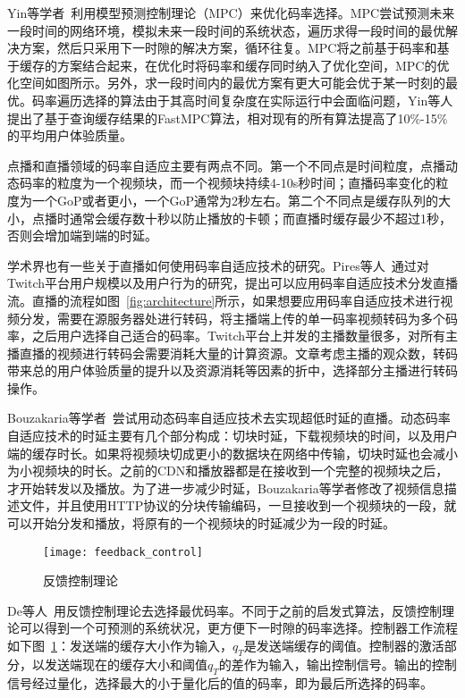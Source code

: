 Yin等学者~\cite{yin2015control}利用模型预测控制理论（MPC）来优化码率选择。MPC尝试预测未来一段时间的网络环境，模拟未来一段时间的系统状态，遍历求得一段时间的最优解决方案，然后只采用下一时隙的解决方案，循环往复。MPC将之前基于码率和基于缓存的方案结合起来，在优化时将码率和缓存同时纳入了优化空间，MPC的优化空间如图所示。另外，求一段时间内的最优方案有更大可能会优于某一时刻的最优。码率遍历选择的算法由于其高时间复杂度在实际运行中会面临问题，Yin等人提出了基于查询缓存结果的FastMPC算法，相对现有的所有算法提高了10\%-15\%的平均用户体验质量。

点播和直播领域的码率自适应主要有两点不同。第一个不同点是时间粒度，点播动态码率的粒度为一个视频块，而一个视频块持续4-10s秒时间；直播码率变化的粒度为一个GoP或者更小，一个GoP通常为2秒左右。第二个不同点是缓存队列的大小，点播时通常会缓存数十秒以防止播放的卡顿；而直播时缓存最少不超过1秒，否则会增加端到端的时延。

学术界也有一些关于直播如何使用码率自适应技术的研究。Pires等人~\cite{pires2014dash}通过对Twitch平台用户规模以及用户行为的研究，提出可以应用码率自适应技术分发直播流。直播的流程如图~\ref{fig:architecture}所示，如果想要应用码率自适应技术进行视频分发，需要在源服务器处进行转码，将主播端上传的单一码率视频转码为多个码率，之后用户选择自己适合的码率。Twitch平台上并发的主播数量很多，对所有主播直播的视频进行转码会需要消耗大量的计算资源。文章考虑主播的观众数，转码带来总的用户体验质量的提升以及资源消耗等因素的折中，选择部分主播进行转码操作。

Bouzakaria等学者~\cite{bouzakaria2014overhead}尝试用动态码率自适应技术去实现超低时延的直播。动态码率自适应技术的时延主要有几个部分构成：切块时延，下载视频块的时间，以及用户端的缓存时长。如果将视频块切成更小的数据块在网络中传输，切块时延也会减小为小视频块的时长。之前的CDN和播放器都是在接收到一个完整的视频块之后，才开始转发以及播放。为了进一步减少时延，Bouzakaria等学者修改了视频信息描述文件，并且使用HTTP协议的分块传输编码，一旦接收到一个视频块的一段，就可以开始分发和播放，将原有的一个视频块的时延减少为一段的时延。

\begin{figure}[h]%
  \centering
  \texttt{[image: feedback\_control]}
  \caption{反馈控制理论~\cite{de2011feedback}}
  \label{fig:feedback_control}
\end{figure}

De等人~\cite{de2011feedback}用反馈控制理论去选择最优码率。不同于之前的启发式算法，反馈控制理论可以得到一个可预测的系统状况，更方便下一时隙的码率选择。控制器工作流程如下图~\ref{fig:feedback_control}：发送端的缓存大小作为输入，$q_T$是发送端缓存的阈值。控制器的激活部分，以发送端现在的缓存大小和阈值$q_T$的差作为输入，输出控制信号。输出的控制信号经过量化，选择最大的小于量化后的值的码率，即为最后所选择的码率。

